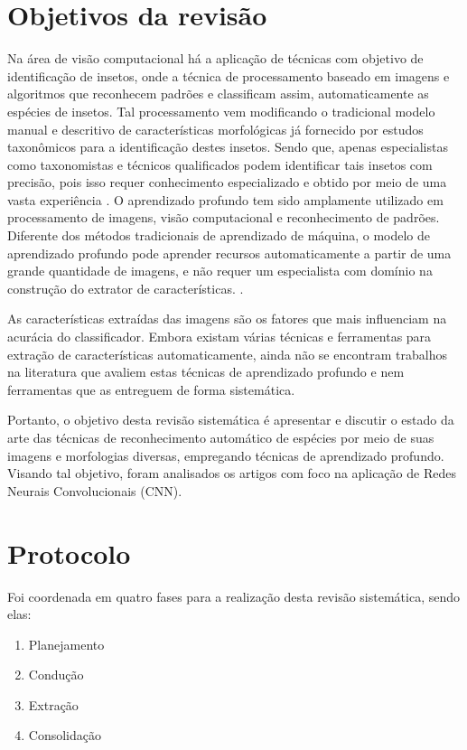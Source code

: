 \documentclass[
	12pt,				%
	oneside,			%
	a4paper,			%
	english,			%
	brazil				%
	]{abntex2ppgsi}
\begin{document}
\section{Objetivos da revisão}
Na área de visão computacional há a aplicação de técnicas com objetivo de identificação de insetos, onde a técnica de processamento baseado em imagens e algoritmos que reconhecem padrões e classificam assim, automaticamente as espécies de insetos. Tal processamento vem modificando o tradicional modelo manual e descritivo de características morfológicas já fornecido por estudos taxonômicos para a identificação destes insetos. Sendo que, apenas especialistas como taxonomistas e técnicos qualificados podem identificar tais insetos com precisão, pois isso requer conhecimento especializado e obtido por meio de uma vasta experiência \cite{lim2017performance}.
O aprendizado profundo tem sido amplamente utilizado em processamento de imagens, visão computacional e reconhecimento de padrões. Diferente dos métodos tradicionais de aprendizado de máquina, o modelo de aprendizado profundo pode aprender recursos automaticamente a partir de uma grande quantidade de imagens, e não requer um especialista com domínio na construção do extrator de características. \cite{liu2020classification}.

As características extraídas das imagens são os fatores que mais influenciam na acurácia do classificador. Embora existam várias técnicas e ferramentas para extração de características automaticamente, ainda não se encontram trabalhos na literatura que avaliem estas técnicas de aprendizado profundo e nem ferramentas que as entreguem de forma sistemática.

Portanto, o objetivo desta revisão sistemática é apresentar e discutir o estado da arte das técnicas de reconhecimento automático de espécies por meio de suas imagens e morfologias diversas, empregando técnicas de aprendizado profundo. Visando tal objetivo, foram analisados os artigos com foco na aplicação de Redes Neurais Convolucionais (CNN).

\section{Protocolo}

Foi coordenada em quatro fases para a realização desta revisão sistemática, sendo elas:

\begin{enumerate}
  \item Planejamento
  \item Condução
  \item Extração
  \item Consolidação
\end{enumerate}
\end{document}
